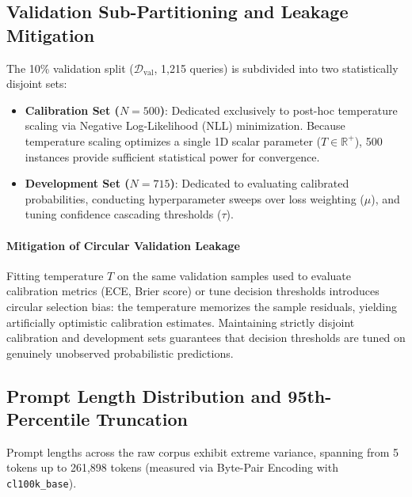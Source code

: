 \documentclass[11pt,a4paper]{article}
\begin{document}
\subsection{Validation Sub-Partitioning and Leakage Mitigation}
\label{subsec:validation_partitioning}

The 10\% validation split ($\mathcal{D}_{\text{val}}$, 1,215 queries) is subdivided into two statistically disjoint sets:
\begin{itemize}
    \item \textbf{Calibration Set ($N = 500$)}: Dedicated exclusively to post-hoc temperature scaling via Negative Log-Likelihood (NLL) minimization. Because temperature scaling optimizes a single 1D scalar parameter ($T \in \mathbb{R}^+$), 500 instances provide sufficient statistical power for convergence.
    \item \textbf{Development Set ($N = 715$)}: Dedicated to evaluating calibrated probabilities, conducting hyperparameter sweeps over loss weighting ($\mu$), and tuning confidence cascading thresholds ($\tau$).
\end{itemize}
\paragraph{Mitigation of Circular Validation Leakage}
Fitting temperature $T$ on the same validation samples used to evaluate calibration metrics (ECE, Brier score) or tune decision thresholds introduces circular selection bias: the temperature memorizes the sample residuals, yielding artificially optimistic calibration estimates. Maintaining strictly disjoint calibration and development sets guarantees that decision thresholds are tuned on genuinely unobserved probabilistic predictions.

\subsection{Prompt Length Distribution and 95th-Percentile Truncation}
\label{subsec:token_truncation}

Prompt lengths across the raw corpus exhibit extreme variance, spanning from 5 tokens up to 261,898 tokens (measured via Byte-Pair Encoding with \texttt{cl100k\_base}).
\end{document}

